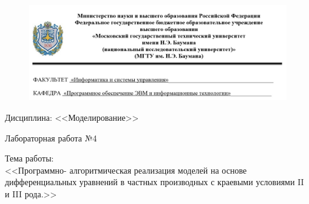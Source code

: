 \documentclass[a4paper,12pt]{article}
\begin{document}
	
	\begin{figure}[h!]
		\begin{center}
			{\includegraphics[scale = 0.4]{titul.jpg}}
			\label{titul}
		\end{center}
	\end{figure}
	
	\vspace*{15mm} 
	
	\huge
	\begin{center}
		Дисциплина: <<Моделирование>>
	\end{center}
	
	\begin{center}
		Лабораторная работа №4
	\end{center}

	
	\huge
	\begin{center}
		Тема работы:\\
		<<Программно- алгоритмическая реализация моделей на основе дифференциальных уравнений в частных производных с краевыми условиями II и  III рода.>>
	\end{center}
	\vspace*{25mm} 
	
\end{document}
